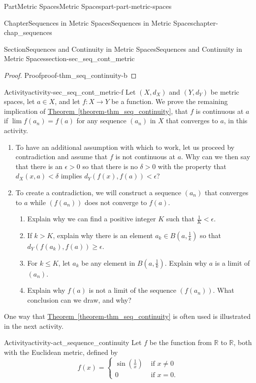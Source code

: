 \documentclass[oneside,10pt,]{book}
\newcommand{\xreffont}{\relax}
\numberwithin{equation}{chapter}
\newcommand{\R}{\mathbb{R}}
\newcommand{\lt}{<}
\newcommand{\gt}{>}
\newcommand{\amp}{&}
\begin{document}
\begin{partptx}{Part}{Metric Spaces}{}{Metric Spaces}{}{}{part-part-metric-spaces}
\begin{chapterptx}{Chapter}{Sequences in Metric Spaces}{}{Sequences in Metric Spaces}{}{}{chapter-chap_sequences}
\begin{sectionptx}{Section}{Sequences and Continuity in Metric Spaces}{}{Sequences and Continuity in Metric Spaces}{}{}{section-sec_seq_cont_metric}
\begin{proof}{Proof}{}{proof-thm_seq_continuity-b}
\end{proof}
\begin{activity}{Activity}{}{activity-sec_seq_cont_metric-f}%
Let \((X,d_X)\) and \((Y,d_Y)\) be metric spaces, let \(a \in X\), and let \(f: X \to Y\) be a function. We prove the remaining implication of \hyperref[theorem-thm_seq_continuity]{Theorem~{\xreffont\ref{theorem-thm_seq_continuity}}}, that \(f\) is continuous at \(a\) if \(\lim f(a_n) = f(a)\) for any sequence \((a_n)\) in \(X\) that converges to \(a\), in this activity.%
\begin{enumerate}[font=\bfseries,label=(\alph*),ref=\alph*]%
\item{}To have an additional assumption with which to work, let us proceed by contradiction and assume that \(f\) is not continuous at \(a\). Why can we then say that there is an \(\epsilon \gt 0\) so that there is no \(\delta \gt 0\) with the property that \(d_X(x,a) \lt \delta\) implies \(d_Y(f(x), f(a)) \lt \epsilon\)?%
\item{}To create a contradiction, we will construct a sequence \((a_n)\) that converges to \(a\) while \((f(a_n))\) does not converge to \(f(a)\).%
\begin{enumerate}[font=\bfseries,label=(\roman*),ref=\theenumi.\roman*]%
\item{}Explain why we can find a positive integer \(K\) such that \(\frac{1}{K} \lt \epsilon\).%
\item{}If \(k \gt K\), explain why there is an element \(a_k \in B\left(a, \frac{1}{k}\right)\) so that \(d_Y(f(a_k),
f(a)) \geq \epsilon\).%
\item{}For \(k \leq K\), let \(a_k\) be any element in \(B\left(a, \frac{1}{k}\right)\). Explain why \(a\) is a limit of \((a_n)\).%
\item{}Explain why \(f(a)\) is not a limit of the sequence \((f(a_n))\). What conclusion can we draw, and why?%
\end{enumerate}%
\end{enumerate}%
\end{activity}%
One way that \hyperref[theorem-thm_seq_continuity]{Theorem~{\xreffont\ref{theorem-thm_seq_continuity}}} is often used is illustrated in the next activity.%
\begin{activity}{Activity}{}{activity-act_sequence_continuity}%
Let \(f\) be the function from \(\R\) to \(\R\), both with the Euclidean metric, defined by%
\begin{equation*}
f(x) = \begin{cases}\sin\left(\frac{1}{x}\right) \amp \text{ if }  x \neq 0 \\ 0 \amp \text{ if }  x = 0. \end{cases}

\end{equation*}
\end{activity}
\end{sectionptx}
\end{chapterptx}
\end{partptx}
\end{document}
